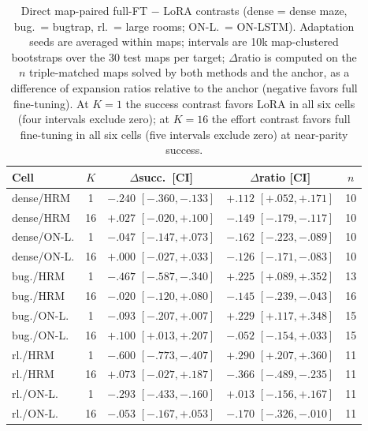\documentclass[letterpaper]{article} %
\begin{document}
\begin{table}[t]
\centering
\small
\setlength{\tabcolsep}{2.2pt}
\begin{tabular}{@{}lccc c@{}}
\toprule
Cell & $K$ & $\Delta$succ.\ [CI] & $\Delta$ratio [CI] & $n$ \\
\midrule
dense/HRM & 1 & $-.240$ $[-.360,-.133]$ & $+.112$ $[+.052,+.171]$ & 10 \\
dense/HRM & 16 & $+.027$ $[-.020,+.100]$ & $-.149$ $[-.179,-.117]$ & 10 \\
dense/ON-L. & 1 & $-.047$ $[-.147,+.073]$ & $-.162$ $[-.223,-.089]$ & 10 \\
dense/ON-L. & 16 & $+.000$ $[-.027,+.033]$ & $-.126$ $[-.171,-.083]$ & 10 \\
bug./HRM & 1 & $-.467$ $[-.587,-.340]$ & $+.225$ $[+.089,+.352]$ & 13 \\
bug./HRM & 16 & $-.020$ $[-.120,+.080]$ & $-.145$ $[-.239,-.043]$ & 16 \\
bug./ON-L. & 1 & $-.093$ $[-.207,+.007]$ & $+.229$ $[+.117,+.348]$ & 15 \\
bug./ON-L. & 16 & $+.100$ $[+.013,+.207]$ & $-.052$ $[-.154,+.033]$ & 15 \\
rl./HRM & 1 & $-.600$ $[-.773,-.407]$ & $+.290$ $[+.207,+.360]$ & 11 \\
rl./HRM & 16 & $+.073$ $[-.027,+.187]$ & $-.366$ $[-.489,-.235]$ & 11 \\
rl./ON-L. & 1 & $-.293$ $[-.433,-.160]$ & $+.013$ $[-.156,+.167]$ & 11 \\
rl./ON-L. & 16 & $-.053$ $[-.167,+.053]$ & $-.170$ $[-.326,-.010]$ & 11 \\
\bottomrule
\end{tabular}
\caption{Direct map-paired full-FT $-$ LoRA contrasts (dense = dense maze, bug.\ = bugtrap, rl.\ = large rooms; ON-L.\ = ON-LSTM). Adaptation seeds are averaged within maps; intervals are 10k map-clustered bootstraps over the 30 test maps per target; $\Delta$ratio is computed on the $n$ triple-matched maps solved by both methods and the anchor, as a difference of expansion ratios relative to the anchor (negative favors full fine-tuning). At $K{=}1$ the success contrast favors LoRA in all six cells (four intervals exclude zero); at $K{=}16$ the effort contrast favors full fine-tuning in all six cells (five intervals exclude zero) at near-parity success.}
\label{tab:directcontrast}
\end{table}
\end{document}
